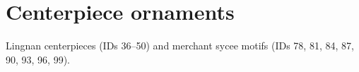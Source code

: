 \chapter{Centerpiece ornaments}

Lingnan centerpieces (IDs 36--50) and merchant sycee motifs (IDs 78, 81, 84, 87, 90, 93, 96, 99).


